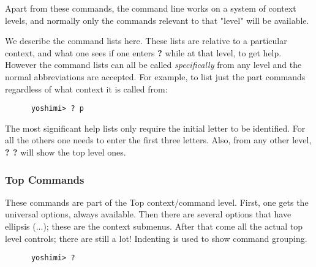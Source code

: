    Apart from these commands, the command line works on a system of context
   levels, and normally only the commands relevant to that "level"
   will be available.

   We describe the command lists here. These lists are relative to a
   particular context, and what one sees if one enters \textbf{?} while at
   that level, to get help. However the command lists can all be called
   \textsl{specifically} from any level and the normal abbreviations are
   accepted. For example, to list just the part commands regardless of what
   context it is called from:
   \begin{verbatim}
      yoshimi> ? p
   \end{verbatim}

   \noindent The most significant help lists only require the initial letter
   to be identified. For all the others one needs to enter the first three
   letters. Also, from any other level, \textbf{? ?} will show the top level
   ones.

\subsubsection{Top Commands}
\label{subsec:command_line_top_command_list}

   These commands are part of the Top context/command level. First, one gets
   the universal options, always available. Then there are several options
   that have ellipsis (...); these are the context submenus. After that come
   all the actual top level controls; there are still a lot!
   Indenting is used to show command grouping.

   \begin{verbatim}
      yoshimi> ?
   \end{verbatim}

